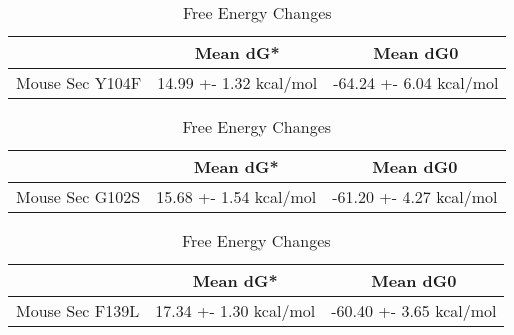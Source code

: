                              
                                \begin{table}[ht]
                                  \centering
                                  \begin{tabular}{|c|c|c|}
                                  \hline
                                    & Mean dG* & Mean dG0 \\
                                  \hline
                                  Mouse Sec Y104F & 14.99 +- 1.32 kcal/mol & -64.24 +- 6.04 kcal/mol \\
                                  \hline
                                  \end{tabular}
                                  \caption{Free Energy Changes}
                                  \end{table}


                                  \begin{table}[ht]
                                    \centering
                                    \begin{tabular}{|c|c|c|}
                                    \hline
                                      & Mean dG* & Mean dG0 \\
                                    \hline
                                    Mouse Sec  G102S & 15.68 +- 1.54 kcal/mol & -61.20 +- 4.27 kcal/mol \\
                                    \hline
                                    \end{tabular}
                                    \caption{Free Energy Changes}
                                    \end{table}

                                    \begin{table}[ht]
                                        \centering
                                        \begin{tabular}{|c|c|c|}
                                        \hline
                                          & Mean dG* & Mean dG0 \\
                                        \hline
                                        Mouse Sec  F139L & 17.34 +- 1.30 kcal/mol & -60.40 +- 3.65 kcal/mol \\
                                        \hline
                                        \end{tabular}
                                        \caption{Free Energy Changes}
                                        \end{table}
                                      
